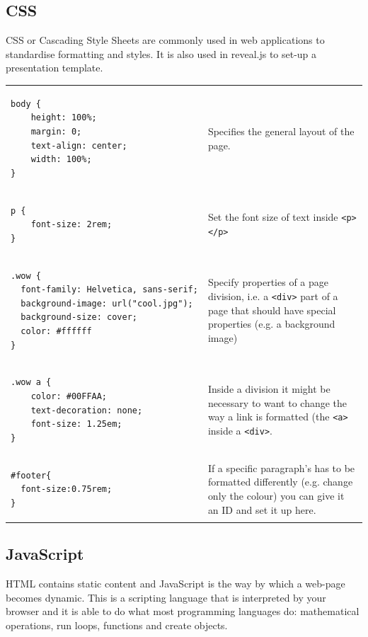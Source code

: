 \documentclass[a4paper]{article}
\begin{document}
\subsection{CSS}
CSS or Cascading Style Sheets are commonly used in web applications to standardise formatting and styles. It is also used in reveal.js to set-up a presentation template.


\begin{tabular}{l l}

\begin{lstlisting}[language=HTML, label=body]
body {
	height: 100%;
	margin: 0;
	text-align: center;
	width: 100%;
}
\end{lstlisting} & Specifies the general layout of the page.\\
\begin{lstlisting}[language=HTML, label=p]
p {
	font-size: 2rem;
}
\end{lstlisting} & Set the font size of text inside \verb|<p></p>|\\
\begin{lstlisting}[language=HTML, label=wow]
.wow {
  font-family: Helvetica, sans-serif;
  background-image: url("cool.jpg");
  background-size: cover;
  color: #ffffff
}
\end{lstlisting} & \parbox{0.4\textwidth}{Specify properties of a page division, i.e. a \texttt{<div>} part of a page that should have special properties (e.g. a background image)}\\
\begin{lstlisting}[language=HTML, label=wowA]
.wow a {
	color: #00FFAA;
	text-decoration: none;
	font-size: 1.25em;
}
\end{lstlisting} & \parbox{0.4\textwidth}{Inside a division it might be necessary to want to change the way a link is formatted (the \texttt{<a>} inside a \texttt{<div>}.}\\
\begin{lstlisting}[language=HTML, label=footer]
#footer{
  font-size:0.75rem;
}
\end{lstlisting} & \parbox{0.4\textwidth}{If a specific paragraph's has to be formatted differently (e.g. change only the colour) you can give it an ID and set it up here.}\\

\end{tabular}

\subsection{JavaScript}
HTML contains static content and JavaScript is the way by which a web-page becomes dynamic. This is a scripting language that is interpreted by your browser and it is able to do what most programming languages do: mathematical operations, run loops, functions and create objects.
\end{document}
